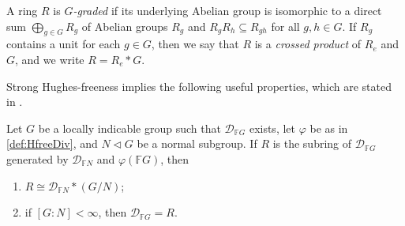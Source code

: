 \documentclass[11pt, letterpaper]{amsart}
\begin{document}
\begin{defn} \label{def:crossedprod}
A ring $R$ is \textit{$G$-graded} if its underlying Abelian group is isomorphic to a direct sum $\bigoplus_{g \in G} R_g$ of Abelian groups $R_g$ and $R_g R_h \subseteq R_{gh}$ for all $g,h \in G$. If $R_g$ contains a unit for each $g \in G$, then we say that $R$ is a \textit{crossed product} of $R_e$ and $G$, and we write $R = R_e * G$.
\end{defn}


Strong Hughes-freeness implies the following useful properties, which are stated in \cite{JaikinZapirain2020THEUO}.

\begin{prop}\label{prop:twistedNormalSkew}
Let $G$ be a locally indicable group such that $\mathcal{D}_{\mathbb{F}G}$ exists, let $\varphi$ be as in \cref{def:HfreeDiv}, and $N \triangleleft G$ be a normal subgroup. If $R$ is the subring of $\mathcal{D}_{\mathbb{F}G}$ generated by $\mathcal{D}_{\mathbb{F}N}$ and $\varphi(\mathbb{F}G)$, then
\begin{enumerate}[label = (\arabic*)]
    \item\label{item:subring} $R \cong \mathcal{D}_{\mathbb{F}N} * (G/N)$;
    \item\label{item:twistedFiniteIndex} if $[G:N] < \infty$, then $\mathcal{D}_{\mathbb{F}G} = R$.
\end{enumerate}
\end{prop}
\end{document}
